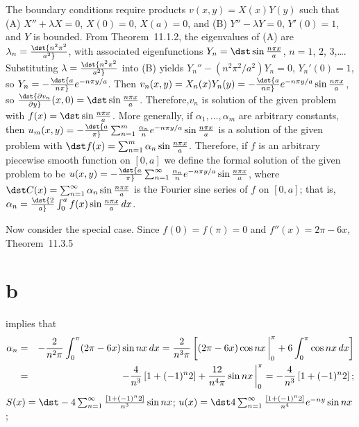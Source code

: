 \documentclass[dvips]{book}
\renewcommand{\exer}[1]{\par\medskip\;\noindent{\color{red}\bf #1.}}
\numberwithin{example}{section}
\numberwithin{equation}{section}
\numberwithin{theorem}{section}
\numberwithin{table}{section}
\numberwithin{figure}{section}
\newcommand{\lims}[2]{\,\bigg|_{#1}^{#2}}
\begin{document}
\exer{12.3.32}
The boundary conditions require products $v(x,y)=X(x)Y(y)$
such that
(A)  $X''+\lambda X=0$, $X(0)=0$, $X(a)=0$, and
(B)  $Y''-\lambda Y=0$, $Y'(0)=1$, and $Y$ is bounded.
From Theorem~11.1.2, the eigenvalues of (A) are
$\lambda_n=\dst{n^2\pi^2\over a^2}$, with associated eigenfunctions
$Y_n=\dst\sin{n\pi x\over a}$, $n=1$, $2$, $3$,\dots.
Substituting $\lambda=\dst{n^2\pi^2\over a^2}$  into (B) yields
$Y_n''-({n^2\pi^2/a^2})Y_n=0$, $Y_n'(0)=1$, so
$Y_n=-\dst {a\over n\pi}e^{-n\pi y/a}$. Then
$v_n(x,y)=X_n(x)Y_n(y)=-\dst {a\over n\pi}e^{-n\pi y/a}
\sin{n\pi x\over a}$, so
$\dst{\partial v_n\over\partial y}(x,0)=\dst\sin{n\pi x\over a}$.
Therefore,$v_n$ is solution of the given problem  with
$f(x)=\dst\sin{n\pi x\over a}$. More generally,
 if $\alpha_1,\dots,\alpha_m$ are arbitrary constants,
then
$u_m(x,y)=-\dst{a\over \pi}\sum_{n=1}^m{\alpha_n\over n} e^{-n\pi
y/a}\sin {n\pi x\over a}$
 is a solution of the given problem with
$\dst f(x)=\sum_{n=1}^m\alpha_n\sin{n\pi x\over a}$.
Therefore, if $f$ is an arbitrary piecewise smooth function on
$[0,a]$  we define the formal solution of the given problem  to be
$u(x,y)=-\dst{a\over \pi}\sum_{n=1}^\infty{\alpha_n\over n} e^{-n\pi
y/a}\sin {n\pi x\over a}$, where
$\dst C(x)=\sum_{n=1}^\infty \alpha_n\sin{n\pi x\over a}$
is the Fourier  sine series of $f$ on $[0,a]$; that is,
$\alpha_n=\dst{2\over a}\int_0^a f(x)\sin
{n\pi x\over a}\,dx$.

Now consider the special case.
Since $f(0)=f(\pi)=0$ and $f''(x)=2\pi-6x$,
Theorem~11.3.5\part{b} implies that
\begin{eqnarray*}
\alpha_n&=&
-{2\over n^2\pi}\int_0^\pi(2\pi-6x)\sin nx\,dx
={2\over n^3\pi}\left[(2\pi-6x)\cos nx\lims0\pi
+6\int_0^\pi\cos nx\,dx\right]\\
&=&-{4\over n^3}\left[1+(-1)^n2\right]+{12\over
n^4\pi}\sin nx\lims0\pi
=-{4\over n^3}\left[1+(-1)^n2\right];
\end{eqnarray*}
$S(x)=\dst-4\sum_{n=1}^\infty{[1+(-1)^n2]\over n^3}
\sin nx$;
$u(x)=\dst4\sum_{n=1}^\infty{[1+(-1)^n2]\over n^4}
e^{-ny}\sin nx$;
\end{document}
